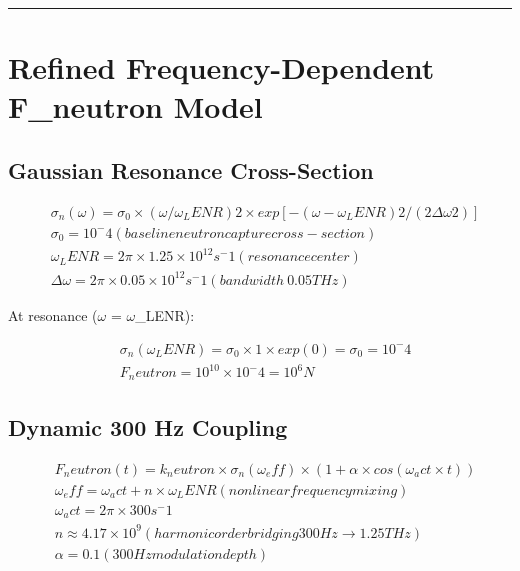 \documentclass[12pt,a4paper]{article}
\begin{document}
\medskip\hrule\medskip

\section{Refined Frequency-Dependent F\_neutron Model}

\subsection{Gaussian Resonance Cross-Section}

\begin{equation}
\begin{aligned}
  & \sigma_n(\omega) = \sigma_0 \times (\omega/\omega_LENR)2 \times exp[-(\omega - \omega_LENR)2 / (2\Delta\omega2)] \\
  & \sigma_0        = 10^-4            (baseline neutron capture cross-section) \\
  & \omega_LENR     = 2\pi \times 1.25\times10^12 s^-1   (resonance center) \\
  & \Delta\omega         = 2\pi \times 0.05\times10^12 s^-1   (bandwidth ~0.05 THz)
\end{aligned}
\end{equation}

At resonance ($\omega$ = $\omega$\_LENR):

\begin{equation}
\begin{aligned}
  & \sigma_n(\omega_LENR) = \sigma_0 \times 1 \times exp(0) = \sigma_0 = 10^-4 \\
  & F_neutron = 10^10 \times 10^-4 = 10^6 N
\end{aligned}
\end{equation}

\subsection{Dynamic 300 Hz Coupling}

\begin{equation}
\begin{aligned}
  & F_neutron(t) = k_neutron \times \sigma_n(\omega_eff) \times (1 + \alpha \times cos(\omega_act \times t)) \\
  & \omega_eff = \omega_act + n \times \omega_LENR  (nonlinear frequency mixing) \\
  & \omega_act = 2\pi \times 300 s^-1 \\
  & n     \approx 4.17 \times 10^9      (harmonic order bridging 300 Hz \to 1.25 THz) \\
  & \alpha     = 0.1              (300 Hz modulation depth)
\end{aligned}
\end{equation}
\end{document}
